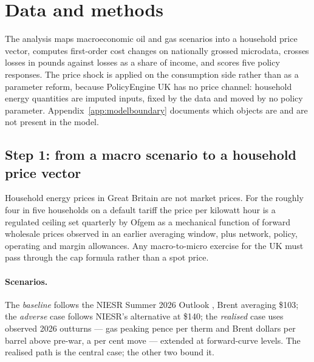 \section{Data and methods}
\label{sec:methodology}

The analysis maps macroeconomic oil and gas scenarios into a household price vector, computes first-order cost changes on nationally grossed microdata, crosses losses in pounds against losses as a share of income, and scores five policy responses. The price shock is applied on the consumption side rather than as a parameter reform, because PolicyEngine UK has no price channel: household energy quantities are imputed inputs, fixed by the data and moved by no policy parameter. Appendix~\ref{app:modelboundary} documents which objects are and are not present in the model.

\subsection{Step 1: from a macro scenario to a household price vector}
\label{sec:step1}

Household energy prices in Great Britain are not market prices. For the roughly four in five households on a default tariff the price per kilowatt hour is a regulated ceiling set quarterly by Ofgem as a mechanical function of forward wholesale prices observed in an earlier averaging window, plus network, policy, operating and margin allowances. Any macro-to-micro exercise for the UK must pass through the cap formula rather than a spot price.

\paragraph{Scenarios.} The \emph{baseline} follows the NIESR Summer 2026 Outlook \citep{niesr2026summer}, Brent averaging \$103; the \emph{adverse} case follows NIESR's alternative \citep{niesr2026spring} at \$140; the \emph{realised} case uses observed 2026 outturns --- gas peaking \genGasPeakPence{} pence per therm and Brent \genOilPeakUsd{} dollars per barrel above pre-war, a \genOilPeakPct{} per cent move --- extended at forward-curve levels. The realised path is the central case; the other two bound it.

